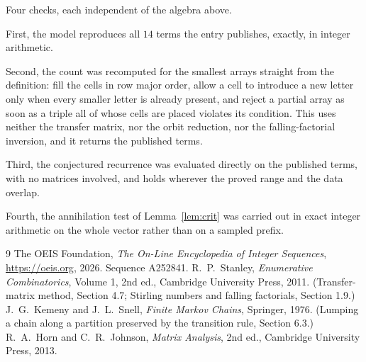 \documentclass[11pt,a4paper]{article}
\theoremstyle{plain}
\theoremstyle{definition}
\begin{document}
Four checks, each independent of the algebra above.

First, the model reproduces all $14$ terms the entry publishes, exactly, in integer
arithmetic.

Second, the count was recomputed for the smallest arrays straight from the definition: fill the
cells in row major order, allow a cell to introduce a new letter only when every smaller letter
is already present, and reject a partial array as soon as a triple all of whose cells are
placed violates its condition. This uses neither the transfer matrix, nor the orbit reduction,
nor the falling-factorial inversion, and it returns the published terms.

Third, the conjectured recurrence was evaluated directly on the published terms, with no
matrices involved, and holds wherever the proved range and the data overlap.

Fourth, the annihilation test of Lemma~\ref{lem:crit} was carried out in exact integer
arithmetic on the whole vector rather than on a sampled prefix.

\begin{thebibliography}{9}
 The OEIS Foundation, \emph{The On-Line Encyclopedia of Integer
Sequences}, \url{https://oeis.org}, 2026. Sequence A252841.
 R.~P.~Stanley, \emph{Enumerative Combinatorics}, Volume 1, 2nd ed.,
Cambridge University Press, 2011. (Transfer-matrix method, Section 4.7; Stirling numbers and
falling factorials, Section 1.9.)
 J.~G.~Kemeny and J.~L.~Snell, \emph{Finite Markov Chains}, Springer,
1976. (Lumping a chain along a partition preserved by the transition rule, Section 6.3.)
 R.~A.~Horn and C.~R.~Johnson, \emph{Matrix Analysis}, 2nd ed., Cambridge
University Press, 2013.
\end{thebibliography}
\end{document}
